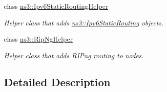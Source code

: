 \begin{DoxyCompactItemize}
class \hyperlink{classns3_1_1Ipv6StaticRoutingHelper}{ns3\+::\+Ipv6\+Static\+Routing\+Helper}
\begin{DoxyCompactList}\small\item\em Helper class that adds \hyperlink{classns3_1_1Ipv6StaticRouting}{ns3\+::\+Ipv6\+Static\+Routing} objects. \end{DoxyCompactList}\item 
class \hyperlink{classns3_1_1RipNgHelper}{ns3\+::\+Rip\+Ng\+Helper}
\begin{DoxyCompactList}\small\item\em Helper class that adds R\+I\+Png routing to nodes. \end{DoxyCompactList}\end{DoxyCompactItemize}


\subsection{Detailed Description}
